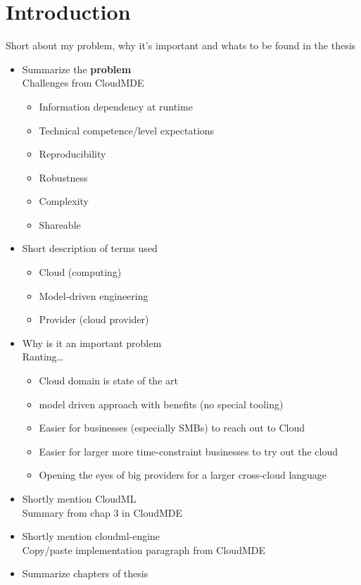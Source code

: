 \section{Introduction}

Short about my problem, why it's important and whats to be found in the thesis 

\begin{itemize}
  \item Summarize the \textbf{problem} \\
      Challenges from CloudMDE
    \begin{itemize}
      \item Information dependency at runtime
      \item Technical competence/level expectations
      \item Reproducibility
      \item Robustness
      \item Complexity
      \item Shareable
    \end{itemize}
  \item Short description of terms used
    \begin{itemize}
      \item Cloud (computing)
      \item Model-driven engineering
      \item Provider (cloud provider)
    \end{itemize}
  \item Why is it an important problem \\
      Ranting\ldots
    \begin{itemize}
      \item Cloud domain is state of the art
      \item model driven approach with benefits (no special tooling)
      \item Easier for businesses (especially SMBs) to reach out to Cloud
      \item Easier for larger more time-constraint businesses to try out the cloud
      \item Opening the eyes of big providers for a larger cross-cloud language
    \end{itemize}
  \item Shortly mention CloudML \\
      Summary from chap 3 in CloudMDE
  \item Shortly mention cloudml-engine \\
      Copy/paste implementation paragraph from CloudMDE
  \item Summarize chapters of thesis
\end{itemize}
